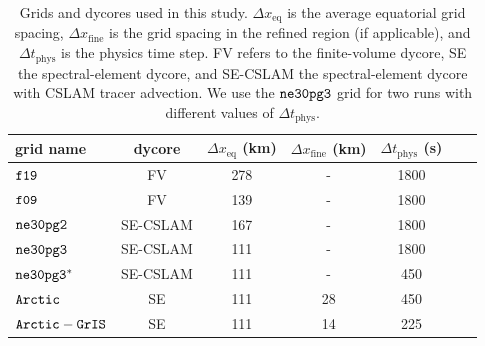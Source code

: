 \documentclass[draft]{agujournal2019}
\begin{document}
 \begin{table}
 \centering
 \scriptsize
 \begin{tabular}{lcccccc}
   \hline
   grid name & dycore & $\Delta x_{\mathrm{eq}}$ (km) & $\Delta x_{\mathrm{fine}}$ (km) & $\Delta t_{\mathrm{phys}}$ (s) & {\color{blue}{cost(25 nodes)}} & {\color{blue}{cost(50 nodes)}} \\ 
   \hline
   $\tt f19$ & FV & 278 & - &1800 & {\color{blue}{436.66}} & {\color{blue}{-}} \\
   $\tt f09$ & FV & 139 & - &1800 & {\color{blue}{1534.57}} & {\color{blue}{2024.24}} \\
   $\tt ne30pg2$ & SE-CSLAM & 167 & - & 1800 & {\color{blue}{1497.26}} & {\color{blue}{1683.97}} \\
   $\tt ne30pg3$ & SE-CSLAM & 111 & - & 1800 & {\color{blue}{1890.48}} & {\color{blue}{2090.43}} \\
   $\tt ne30pg3^{*}$ & SE-CSLAM & 111 & - & 450 & {\color{blue}{-}} & {\color{blue}{-}} \\
   $\tt Arctic$ & SE & 111 & 28 & 450 & {\color{blue}{15947.41}} & {\color{blue}{16675.45}} \\
   $\tt Arctic-GrIS$ & SE & 111 & 14 & 225 & {\color{blue}{40305.03}} & {\color{blue}{41036.67}} \\
 \hline
 \end{tabular}
  \caption{Grids and dycores used in this study. $\Delta x_{\mathrm{eq}}$ is the average equatorial grid spacing, $\Delta x_{\mathrm{fine}}$ is the grid spacing in the refined region (if applicable), and $\Delta t_{\mathrm{phys}}$ is the physics time step. FV refers to the finite-volume dycore, SE the spectral-element dycore, and SE-CSLAM the spectral-element dycore with CSLAM tracer advection. {\color{blue}{The FV dycore uses lat-lon grids, whereas the SE and SE-CSLAM dycores run on unstructured grids.}} We use the $\tt ne30pg3$ grid for two runs with different values of $\Delta t_{\mathrm{phys}}$. {}}
 \label{tbl:table1}
 \end{table}
\end{document}
